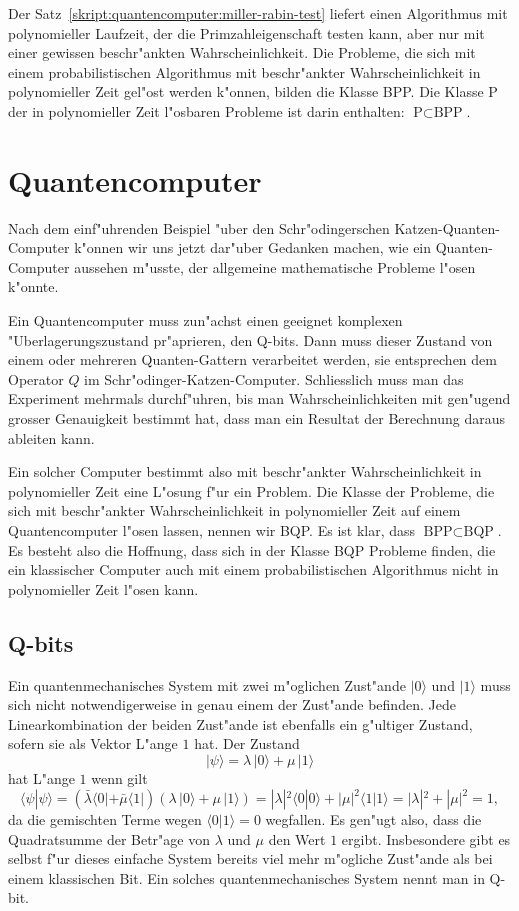 Der Satz~\ref{skript:quantencomputer:miller-rabin-test} liefert einen Algorithmus
mit polynomieller Laufzeit, der die Primzahleigenschaft testen kann,
aber nur mit einer gewissen beschr"ankten Wahrscheinlichkeit.
Die Probleme, die sich mit einem probabilistischen Algorithmus mit
beschr"ankter Wahrscheinlichkeit in polynomieller Zeit gel"ost
werden k"onnen, bilden die Klasse BPP.
Die Klasse P der in polynomieller Zeit l"osbaren Probleme ist darin
enthalten: $\text{P}\subset\text{BPP}$.

\section{Quantencomputer}
Nach dem einf"uhrenden Beispiel "uber den Schr"odingerschen
Katzen-Quanten-Computer k"onnen wir uns jetzt dar"uber Gedanken
machen, wie ein Quanten-Computer aussehen m"usste, der allgemeine
mathematische Probleme l"osen k"onnte.

Ein Quantencomputer muss zun"achst einen geeignet komplexen
"Uberlagerungszustand pr"aprieren, den Q-bits. Dann muss dieser Zustand
von einem oder mehreren Quanten-Gattern verarbeitet werden, sie
entsprechen dem Operator $Q$ im Schr"odinger-Katzen-Computer.
Schliesslich muss man das Experiment mehrmals durchf"uhren, bis man
Wahrscheinlichkeiten mit gen"ugend grosser Genauigkeit bestimmt hat,
dass man ein Resultat der Berechnung daraus ableiten kann.

Ein solcher Computer bestimmt also mit beschr"ankter Wahrscheinlichkeit
in polynomieller Zeit eine L"osung f"ur ein Problem. Die
Klasse der Probleme, die sich mit beschr"ankter Wahrscheinlichkeit in
polynomieller Zeit auf einem Quantencomputer l"osen lassen, nennen wir
BQP.
Es ist klar, dass $\text{BPP}\subset\text{BQP}$.
Es besteht also die Hoffnung, dass sich in der Klasse BQP Probleme finden,
die ein klassischer Computer auch mit einem probabilistischen Algorithmus
nicht in polynomieller Zeit l"osen kann.

\subsection{Q-bits}
Ein quantenmechanisches System mit zwei m"oglichen Zust"ande $|0\rangle$
und $|1\rangle$ muss sich nicht
notwendigerweise in genau einem der Zust"ande befinden.
Jede Linearkombination der beiden Zust"ande ist ebenfalls ein g"ultiger
Zustand, sofern sie als Vektor L"ange $1$ hat.
Der Zustand
\[
|\psi\rangle
=
\lambda \,|0\rangle + \mu\,|1\rangle
\]
hat L"ange $1$ wenn gilt
\[
\langle\psi|\psi\rangle
=
(
\bar\lambda
\langle 0|
+
\bar\mu
\langle 1|
)
(
\lambda \,|0\rangle + \mu\,|1\rangle
)
=
|\lambda|^2\langle 0|0\rangle + |\mu|^2\langle 1|1\rangle
=
|\lambda|^2+|\mu|^2
=
1
,
\]
da die gemischten Terme wegen $\langle 0|1\rangle=0$ wegfallen.
Es gen"ugt also, dass die Quadratsumme der Betr"age von $\lambda$ und $\mu$
den Wert $1$ ergibt.
Insbesondere gibt es selbst f"ur dieses einfache System bereits viel
mehr m"ogliche Zust"ande als bei einem klassischen Bit.
Ein solches quantenmechanisches System nennt man in Q-bit.


